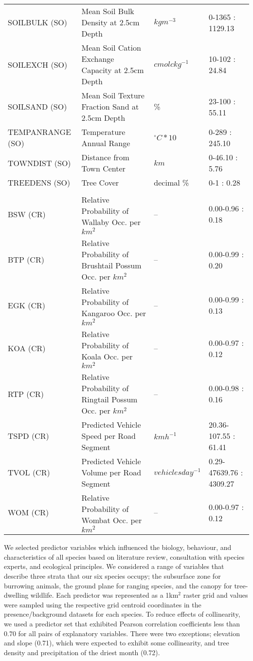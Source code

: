 \begin{table}[htp]
\begin{tabularx}{0.9\textwidth}{lYll}
SOILBULK (SO)   &Mean Soil Bulk Density at 2.5cm Depth                    &$kg m^{-3}$       &0-1365 : 1129.13\\
SOILEXCH (SO)   &Mean Soil Cation Exchange Capacity at 2.5cm Depth        &$cmolc kg^{-1}$     &10-102 : 24.84\\
SOILSAND (SO)   &Mean Soil Texture Fraction Sand at 2.5cm Depth           &\%             &23-100 : 55.11\\
TEMPANRANGE (SO)&Temperature Annual Range                                 &$^{\circ}C*10$ &0-289 : 245.10\\
TOWNDIST (SO)   &Distance from Town Center                                &$km$           &0-46.10 : 5.76\\
TREEDENS (SO)   &Tree Cover                                               &decimal \%     &0-1 : 0.28\\
&&&\\
BSW (CR)        &Relative Probability of Wallaby Occ. per $km^2$          &--             &0.00-0.96 : 0.18\\
BTP (CR)        &Relative Probability of Brushtail Possum Occ. per $km^2$ &--             &0.00-0.99 : 0.20\\
EGK (CR)        &Relative Probability of Kangaroo Occ. per $km^2$         &--             &0.00-0.99 : 0.13\\
KOA (CR)        &Relative Probability of Koala Occ. per $km^2$            &--             &0.00-0.97 : 0.12\\
RTP (CR)        &Relative Probability of Ringtail Possum Occ. per $km^2$  &--             &0.00-0.98 : 0.16\\
TSPD (CR)       &Predicted Vehicle Speed per Road Segment                 &$km h^{-1}$         &20.36-107.55 : 61.41\\
TVOL (CR)       &Predicted Vehicle Volume per Road Segment                &$vehicles day^{-1}$ &0.29-47639.76 : 4309.27\\
WOM (CR)        &Relative Probability of Wombat Occ. per $km^2$           &--             &0.00-0.97 : 0.12\\
\bottomrule
\end{tabularx}
\label{6sp_variables}
\end{table}

We selected predictor variables which influenced the biology, behaviour, and characteristics of all species based on literature review, consultation with species experts, and ecological principles. We considered a range of variables that describe three strata that our six species occupy; the subsurface zone for burrowing animals, the ground plane for ranging species, and the canopy for tree-dwelling wildlife. Each predictor was represented as a 1km$^2$ raster grid and values were sampled using the respective grid centroid coordinates in the presence/background datasets for each species. To reduce effects of collinearity, we used a predictor set that exhibited Pearson correlation coefficients less than 0.70 for all pairs of explanatory variables. There were two exceptions; elevation and slope (0.71), which were expected to exhibit some collinearity, and tree density and precipitation of the driest month (0.72).

